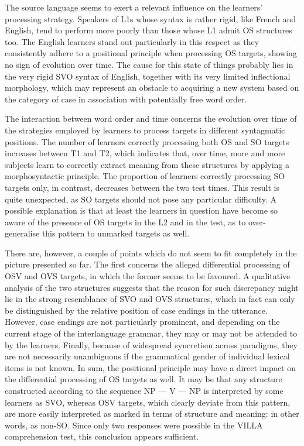 The source language seems to exert a relevant influence on the learners' processing strategy. Speakers of L1s whose syntax is rather rigid, like French and English, tend to perform more poorly than those whose L1 admit OS structures too. The English learners stand out particularly in this respect as they consistently adhere to a positional principle when processing OS targets, showing no sign of evolution over time. The cause for this state of things probably lies in the very rigid SVO syntax of English, together with its very limited inflectional morphology, which may represent an obstacle to acquiring a new system based on the category of case in association with potentially free word order.

The interaction between word order and time concerns the evolution over time of the strategies employed by learners to process targets in different syntagmatic positions. The number of learners correctly processing both OS and SO targets increases between T1 and T2, which indicates that, over time, more and more subjects learn to correctly extract meaning from these structures by applying a morphosyntactic principle. The proportion of learners correctly processing SO targets only, in contrast, decreases between the two test times. This result is quite unexpected, as SO targets should not pose any particular difficulty. A possible explanation is that at least the learners in question have become so aware of the presence of OS targets in the L2 and in the test, as to over-generalise this pattern to unmarked targets as well.

There are, however, a couple of points which do not seem to fit completely in the picture presented so far. The first concerns the alleged differential processing of OSV and OVS targets, in which the former seems to be favoured. A qualitative analysis of the two structures suggests that the reason for such discrepancy might lie in the strong resemblance of SVO and OVS structures, which in fact can only be distinguished by the relative position of case endings in the utterance. However, case endings are not particularly prominent, and depending on the current stage of the interlanguage grammar, they may or may not be attended to by the learners. Finally, because of widespread syncretism across paradigms, they are not necessarily unambiguous if the grammatical gender of individual lexical items is not known. In sum, the positional principle may have a direct impact on the differential processing of OS targets as well. It may be that any structure constructed according to the sequence NP — V — NP is interpreted by some learners as SVO, whereas OSV targets, which clearly deviate from this pattern, are more easily interpreted as marked in terms of structure and meaning: in other words, as non-SO. Since only two responses were possible in the VILLA comprehension test, this conclusion appears sufficient. 

